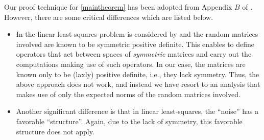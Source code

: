 Our proof technique for \cref{maintheorem} has been adopted from Appendix $B$ of \citet{bachharder}.  
However, there are some critical differences which are listed below. 
\begin{itemize}
\item In the linear least-squares problem is considered by \citet{bachharder} and the random matrices involved are known to be symmetric positive definite. This enables \citet{bachharder} to define operators that act between spaces of \emph{symmetric} matrices and carry out the computations making use of such operators. In our case, the matrices are known only to be (laxly) positive definite, i.e., they lack symmetry. 
Thus, the above approach does not work, and instead we have resort to an analysis that makes use of only the expected norms of the random matrices involved.
\item Another significant difference is that in linear least-squares, the ``noise'' has a favorable ``structure''. Again, due to the lack of symmetry, this favorable structure does not apply. 
\end{itemize}

